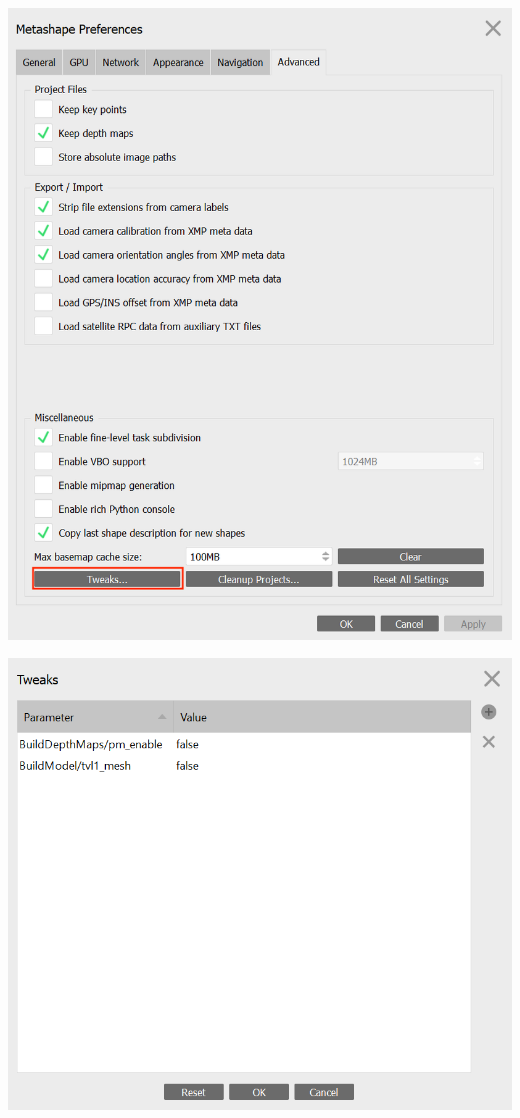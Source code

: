 \documentclass[
]{book}
\begin{document}
\includegraphics[width=1\textwidth,height=\textheight]{Figures/Metashape_tweaks_1.png}

\includegraphics[width=1\textwidth,height=\textheight]{Figures/Metashape_tweaks_2.png}
\end{document}
